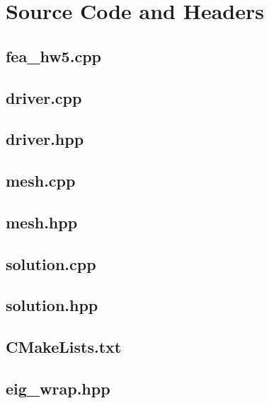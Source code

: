 \documentclass[a4paper, 12pt]{article}
\begin{document}
\newpage
\appendix
\section{Source Code and Headers} \label{sec:code}

\subsection{fea\_hw5.cpp} \label{subsec:fea_hw5.cpp}


\subsection{driver.cpp} \label{subsec:driver.cpp}

\subsection{driver.hpp} \label{subsec:driver.hpp}


\subsection{mesh.cpp} \label{subsec:mesh.cpp}

\subsection{mesh.hpp} \label{subsec:mesh.hpp}


\subsection{solution.cpp} \label{subsec:solution.cpp}

\subsection{solution.hpp} \label{subsec:solution.hpp}


\subsection{CMakeLists.txt} \label{subsec:CMakeLists.txt}


\subsection{eig\_wrap.hpp} \label{subsec:eig_wrap.hpp}

\end{document}
